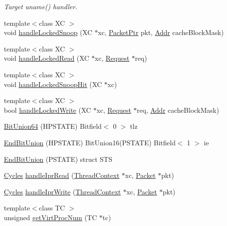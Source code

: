 \begin{DoxyCompactItemize}
\begin{DoxyCompactList}\small\item\em Target uname() handler. \item\end{DoxyCompactList}\item 
{\footnotesize template$<$class XC $>$ }\\void \hyperlink{namespaceSparcISA_a1118bbdd22f21a6b48b9cb896bf5936e}{handleLockedSnoop} (XC $\ast$xc, \hyperlink{classPacket}{PacketPtr} pkt, \hyperlink{base_2types_8hh_af1bb03d6a4ee096394a6749f0a169232}{Addr} cacheBlockMask)
\item 
{\footnotesize template$<$class XC $>$ }\\void \hyperlink{namespaceSparcISA_a1d5d45cf417e886718ca52e167707a6c}{handleLockedRead} (XC $\ast$xc, \hyperlink{classRequest}{Request} $\ast$req)
\item 
{\footnotesize template$<$class XC $>$ }\\void \hyperlink{namespaceSparcISA_a814f89ef85d9ebdb602f6b241ea40142}{handleLockedSnoopHit} (XC $\ast$xc)
\item 
{\footnotesize template$<$class XC $>$ }\\bool \hyperlink{namespaceSparcISA_a51c8abbc4167f28f928dcf5413bfd23d}{handleLockedWrite} (XC $\ast$xc, \hyperlink{classRequest}{Request} $\ast$req, \hyperlink{base_2types_8hh_af1bb03d6a4ee096394a6749f0a169232}{Addr} cacheBlockMask)
\item 
\hyperlink{namespaceSparcISA_abe81ef90e3604c575f470d6bd37d031b}{BitUnion64} (HPSTATE) Bitfield$<$ 0 $>$ tlz
\item 
\hyperlink{namespaceSparcISA_ac857bae84fbb9872a54fff13d22d6eb0}{EndBitUnion} (HPSTATE) BitUnion16(PSTATE) Bitfield$<$ 1 $>$ ie
\item 
\hyperlink{namespaceSparcISA_a076c40062819aabeb97f74d33ce972a9}{EndBitUnion} (PSTATE) struct STS
\item 
\hyperlink{classCycles}{Cycles} \hyperlink{namespaceSparcISA_a7ffad0153adc8a171207f50d0fe42349}{handleIprRead} (\hyperlink{classThreadContext}{ThreadContext} $\ast$xc, \hyperlink{classPacket}{Packet} $\ast$pkt)
\item 
\hyperlink{classCycles}{Cycles} \hyperlink{namespaceSparcISA_a57a617c69d03da2039f82d07f711e03e}{handleIprWrite} (\hyperlink{classThreadContext}{ThreadContext} $\ast$xc, \hyperlink{classPacket}{Packet} $\ast$pkt)
\item 
{\footnotesize template$<$class TC $>$ }\\unsigned \hyperlink{namespaceSparcISA_a94f35932feb0cb5ef4428bf4572343e3}{getVirtProcNum} (TC $\ast$tc)

\end{DoxyCompactItemize}
